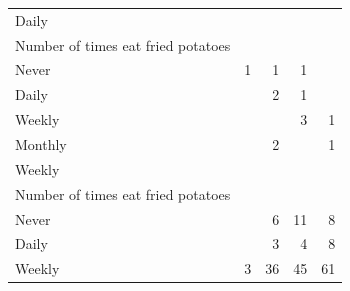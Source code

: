 \documentclass{article}
\begin{document}
\begin{table}[!h]
{\begin{tabular}{lllll}
			\multicolumn{1}{l}{\hspace{3em}Daily} &
			\multicolumn{1}{|r}{} &
			\multicolumn{1}{r}{} &
			\multicolumn{1}{r}{} &
			\multicolumn{1}{r}{} \\
			\multicolumn{1}{l}{\hspace{4em}Number of times eat fried potatoes} &
			\multicolumn{1}{|r}{} &
			\multicolumn{1}{r}{} &
			\multicolumn{1}{r}{} &
			\multicolumn{1}{r}{} \\
			\multicolumn{1}{l}{\hspace{5em}Never} &
			\multicolumn{1}{|r}{1} &
			\multicolumn{1}{r}{1} &
			\multicolumn{1}{r}{1} &
			\multicolumn{1}{r}{} \\
			\multicolumn{1}{l}{\hspace{5em}Daily} &
			\multicolumn{1}{|r}{} &
			\multicolumn{1}{r}{2} &
			\multicolumn{1}{r}{1} &
			\multicolumn{1}{r}{} \\
			\multicolumn{1}{l}{\hspace{5em}Weekly} &
			\multicolumn{1}{|r}{} &
			\multicolumn{1}{r}{} &
			\multicolumn{1}{r}{3} &
			\multicolumn{1}{r}{1} \\
			\multicolumn{1}{l}{\hspace{5em}Monthly} &
			\multicolumn{1}{|r}{} &
			\multicolumn{1}{r}{2} &
			\multicolumn{1}{r}{} &
			\multicolumn{1}{r}{1} \\
			\multicolumn{1}{l}{\hspace{3em}Weekly} &
			\multicolumn{1}{|r}{} &
			\multicolumn{1}{r}{} &
			\multicolumn{1}{r}{} &
			\multicolumn{1}{r}{} \\
			\multicolumn{1}{l}{\hspace{4em}Number of times eat fried potatoes} &
			\multicolumn{1}{|r}{} &
			\multicolumn{1}{r}{} &
			\multicolumn{1}{r}{} &
			\multicolumn{1}{r}{} \\
			\multicolumn{1}{l}{\hspace{5em}Never} &
			\multicolumn{1}{|r}{} &
			\multicolumn{1}{r}{6} &
			\multicolumn{1}{r}{11} &
			\multicolumn{1}{r}{8} \\
			\multicolumn{1}{l}{\hspace{5em}Daily} &
			\multicolumn{1}{|r}{} &
			\multicolumn{1}{r}{3} &
			\multicolumn{1}{r}{4} &
			\multicolumn{1}{r}{8} \\
			\multicolumn{1}{l}{\hspace{5em}Weekly} &
			\multicolumn{1}{|r}{3} &
			\multicolumn{1}{r}{36} &
			\multicolumn{1}{r}{45} &
			\multicolumn{1}{r}{61} \\

\end{tabular}}
\end{table}
\end{document}
